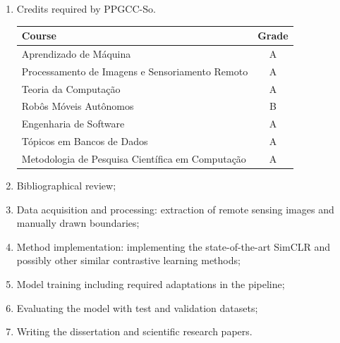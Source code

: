 \documentclass[12pt]{article}
\begin{document}
\begin{enumerate}
	\item Credits required by PPGCC-So.

\begin{center}
	\begin{tabular}{|l|c|}
		\hline
		\textbf{Course} & \textbf{Grade} \\ \hline
		Aprendizado de Máquina & A \\ \hline
		Processamento de Imagens e Sensoriamento Remoto & A \\ \hline
		Teoria da Computação & A \\ \hline
		Robôs Móveis Autônomos & B \\ \hline
		Engenharia de Software & A \\ \hline
		Tópicos em Bancos de Dados & A \\ \hline
		Metodologia de Pesquisa Científica em Computação & A \\ \hline
	\end{tabular}
\end{center}	

	\item Bibliographical review;
	\item Data acquisition and processing: extraction of remote sensing images and manually drawn boundaries;
	\item Method implementation: implementing the state-of-the-art SimCLR and possibly other similar contrastive learning methods;
	\item Model training including required adaptations in the pipeline;
	\item Evaluating the model with test and validation datasets;
	\item Writing the dissertation and scientific research papers.


\end{enumerate}
\end{document}
